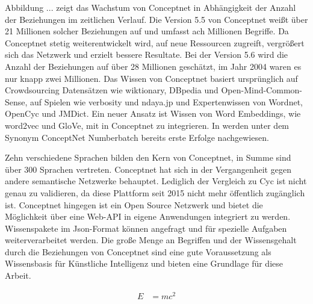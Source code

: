 Abbildung ... zeigt das Wachstum von Conceptnet in Abhängigkeit der Anzahl der Beziehungen im zeitlichen Verlauf. Die Version 5.5 von Conceptnet weißt über 21 Millionen solcher Beziehungen auf und umfasst ach Millionen Begriffe. Da Conceptnet stetig weiterentwickelt wird, auf neue Ressourcen zugreift, vergrößert sich das Netzwerk und erzielt bessere Resultate. Bei der Version 5.6 wird die Anzahl der Beziehungen auf über 28 Millionen geschätzt, im Jahr 2004 waren es nur knapp zwei Millionen. 
Das Wissen von Conceptnet basiert ursprünglich auf Crowdsourcing Datensätzen wie wiktionary, DBpedia und Open-Mind-Common-Sense, auf Spielen wie verbosity und ndaya.jp und Expertenwissen von Wordnet, OpenCyc und JMDict. Ein neuer Ansatz ist Wissen von Word Embeddings, wie word2vec und GloVe, mit in Conceptnet zu integrieren. In \cite{speer2017conceptnet} werden unter dem Synonym ConceptNet Numberbatch bereits erste Erfolge nachgewiesen.

Zehn verschiedene Sprachen bilden den Kern von Conceptnet, in Summe sind über 300 Sprachen vertreten. Conceptnet hat sich in der Vergangenheit gegen andere semantische Netzwerke behauptet. Lediglich der Vergleich zu Cyc ist nicht genau zu validieren, da diese Plattform seit 2015 nicht mehr öffentlich zugänglich ist. Conceptnet hingegen ist ein Open Source Netzwerk und bietet die Möglichkeit über eine Web-API in eigene Anwendungen integriert zu werden. Wissenspakete im Json-Format können angefragt und für spezielle Aufgaben weiterverarbeitet werden. 
Die große Menge an Begriffen und der Wissensgehalt durch die Beziehungen von Conceptnet sind eine gute Voraussetzung als Wissensbasis für Künstliche Intelligenz und bieten eine Grundlage für diese Arbeit. 
\cite{liu2004conceptnet}
\cite{havasi2007conceptnet}
\cite{speer2013conceptnet}
\cite{speer2017conceptnet} 

\begin{align}
E &= mc^2
\end{align}





